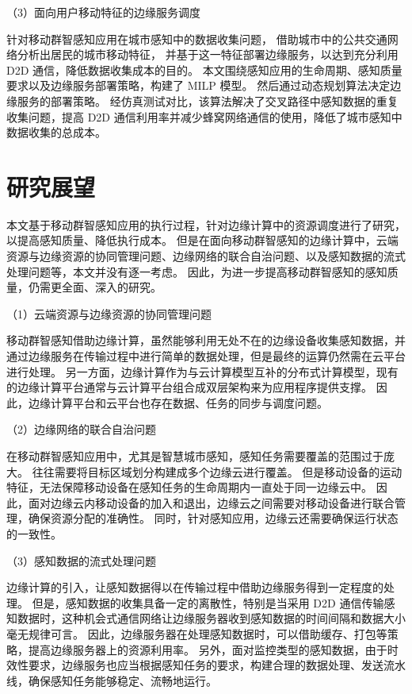 （3）面向用户移动特征的边缘服务调度

针对移动群智感知应用在城市感知中的数据收集问题，
借助城市中的公共交通网络分析出居民的城市移动特征，
并基于这一特征部署边缘服务，以达到充分利用 D2D 通信，降低数据收集成本的目的。
本文围绕感知应用的生命周期、感知质量要求以及边缘服务部署策略，构建了 MILP 模型。
然后通过动态规划算法决定边缘服务的部署策略。
经仿真测试对比，该算法解决了交叉路径中感知数据的重复收集问题，提高 D2D 通信利用率并减少蜂窝网络通信的使用，降低了城市感知中数据收集的总成本。

\section{研究展望}

本文基于移动群智感知应用的执行过程，针对边缘计算中的资源调度进行了研究，以提高感知质量、降低执行成本。
但是在面向移动群智感知的边缘计算中，云端资源与边缘资源的协同管理问题、边缘网络的联合自治问题、以及感知数据的流式处理问题等，本文并没有逐一考虑。
因此，为进一步提高移动群智感知的感知质量，仍需更全面、深入的研究。

（1）云端资源与边缘资源的协同管理问题

移动群智感知借助边缘计算，虽然能够利用无处不在的边缘设备收集感知数据，并通过边缘服务在传输过程中进行简单的数据处理，但是最终的运算仍然需在云平台进行处理。
另一方面，边缘计算作为与云计算模型互补的分布式计算模型，现有的边缘计算平台通常与云计算平台组合成双层架构来为应用程序提供支撑。
因此，边缘计算平台和云平台也存在数据、任务的同步与调度问题。

（2）边缘网络的联合自治问题

在移动群智感知应用中，尤其是智慧城市感知，感知任务需要覆盖的范围过于庞大。
往往需要将目标区域划分构建成多个边缘云进行覆盖。
但是移动设备的运动特征，无法保障移动设备在感知任务的生命周期内一直处于同一边缘云中。
因此，面对边缘云内移动设备的加入和退出，边缘云之间需要对移动设备进行联合管理，确保资源分配的准确性。
同时，针对感知应用，边缘云还需要确保运行状态的一致性。

（3）感知数据的流式处理问题

边缘计算的引入，让感知数据得以在传输过程中借助边缘服务得到一定程度的处理。
但是，感知数据的收集具备一定的离散性，特别是当采用 D2D 通信传输感知数据时，这种机会式通信网络让边缘服务器收到感知数据的时间间隔和数据大小毫无规律可言。
因此，边缘服务器在处理感知数据时，可以借助缓存、打包等策略，提高边缘服务器上的资源利用率。
另外，面对监控类型的感知数据，由于时效性要求，边缘服务也应当根据感知任务的要求，构建合理的数据处理、发送流水线，确保感知任务能够稳定、流畅地运行。
